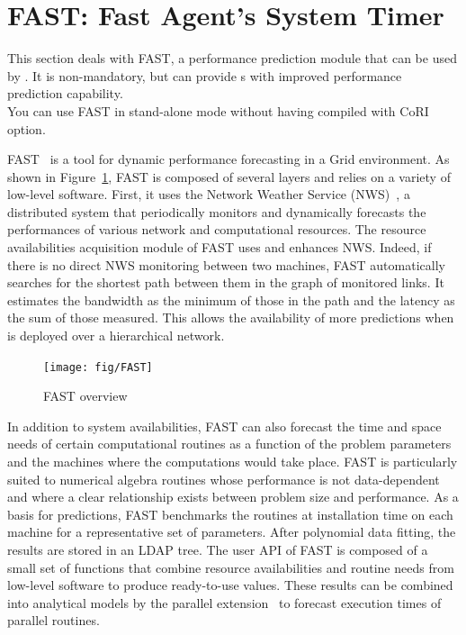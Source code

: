 \section{FAST: Fast Agent's System Timer}
\label{sec:FAST}

This section deals with FAST, a performance prediction module that can
be used by \diet. It is non-mandatory, but can provide {\sed}s with
improved performance prediction capability.\\
You can use FAST in stand-alone mode without having compiled with
CoRI option.

FAST~\cite{Qui02} is a tool for dynamic performance forecasting in a
Grid environment. As shown in Figure~\ref{fig:fast-overview}, FAST
is composed of several layers and relies on a variety of low-level
software. First, it uses the Network Weather Service
(NWS)~\cite{WSH99}, a distributed system that periodically monitors
and dynamically forecasts the performances of various network and
computational resources. The resource availabilities acquisition
module of FAST uses and enhances NWS. Indeed, if there is no direct
NWS monitoring between two machines, FAST automatically searches for
the shortest path between them in the graph of monitored links. It
estimates the bandwidth as the minimum of those in the path and the
latency as the sum of those measured. This allows the
availability of more predictions when \diet is deployed over a
hierarchical network.

\begin{figure}[htb]
  \begin{center}
    \texttt{[image: fig/FAST]}
    \caption{FAST overview}
    \label{fig:fast-overview}
  \end{center}
\end{figure}

In addition to system availabilities, FAST can also forecast the
time and space needs of certain computational routines as a function
of the problem parameters and the machines where the computations
would take place.  FAST is particularly suited to numerical algebra
routines whose performance is not data-dependent and where a clear
relationship exists between problem size and performance. As a basis
for predictions, FAST benchmarks the routines at installation time
on each machine for a representative set of parameters. After
polynomial data fitting, the results are stored in an LDAP tree. The
user API of FAST is composed of a small set of functions that
combine resource availabilities and routine needs from low-level
software to produce ready-to-use values.  These results can be
combined into analytical models by the parallel
extension~\cite{CS02} to forecast execution times of parallel
routines.

